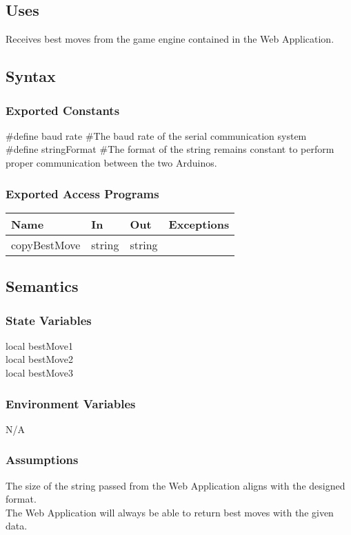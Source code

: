 \documentclass[12pt, titlepage]{article}
\begin{document}
    \subsection{Uses}
    Receives best moves from the game engine contained in the Web Application.

    \subsection{Syntax}
    \subsubsection{Exported Constants}
    \#define baud rate \#The baud rate of the serial communication system\\
    \#define stringFormat \#The format of the string remains constant to perform proper 
    communication between the two Arduinos.
    
    \subsubsection{Exported Access Programs}
        \begin{center}
        \begin{tabular}{p{4cm} p{3cm} p{3cm} p{2.5cm}}
        \hline
        \textbf{Name} & \textbf{In} & \textbf{Out} & \textbf{Exceptions} \\
        \hline
        copyBestMove & string & string & \\
        \hline
        \end{tabular}
        \end{center}

    \subsection{Semantics}
    \subsubsection{State Variables}
    local bestMove1 \\
    local bestMove2 \\
    local bestMove3 

    \subsubsection{Environment Variables}
    N/A

    \subsubsection{Assumptions}
    The size of the string passed from the Web Application aligns with the designed format. \\
    The Web Application will always be able to return best moves with the given data. 
\end{document}
